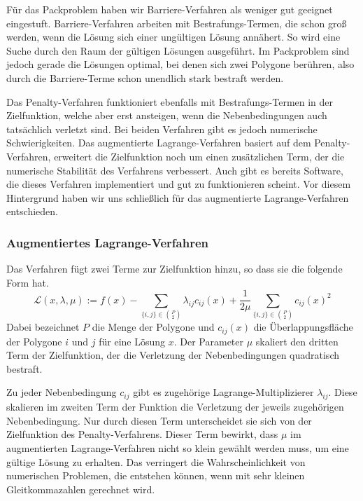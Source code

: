 \documentclass[runningheads,a4paper]{llncs}
\begin{document}
Für das Packproblem haben wir Barriere-Verfahren als weniger gut geeignet eingestuft. Barriere-Verfahren arbeiten mit Bestrafungs-Termen, die schon groß werden, wenn die Lösung sich einer ungültigen Lösung annähert. So wird eine Suche durch den Raum der gültigen Lösungen ausgeführt. Im Packproblem sind jedoch gerade die Lösungen optimal, bei denen sich zwei Polygone berühren, also durch die Barriere-Terme schon unendlich stark bestraft werden.

Das Penalty-Verfahren funktioniert ebenfalls mit Bestrafungs-Termen in der Zielfunktion, welche aber erst ansteigen, wenn die Nebenbedingungen auch tatsächlich verletzt sind. Bei beiden Verfahren gibt es jedoch numerische Schwierigkeiten. \cite{nocedal1999numerical} Das augmentierte Lagrange-Verfahren basiert auf dem Penalty-Verfahren, erweitert die Zielfunktion noch um einen zusätzlichen Term, der die numerische Stabilität des Verfahrens verbessert. Auch gibt es bereits Software, die dieses Verfahren implementiert und gut zu funktionieren scheint. \cite{Conn:2010:LFP:1965037} Vor diesem Hintergrund haben wir uns schließlich für das augmentierte Lagrange-Verfahren entschieden.

\subsubsection{Augmentiertes Lagrange-Verfahren}
Das Verfahren fügt zwei Terme zur Zielfunktion hinzu, so dass sie die folgende Form hat.
\begin{equation}
\label{eq:aug_lagrangian}
\mathcal{L}(x,\lambda,\mu) := f(x) - \sum_{\{i,j\}\in {P \choose 2}} \lambda_{ij} c_{ij}(x) + \frac{1}{2\mu}\sum_{\{i,j\}\in {P \choose 2}} c_{ij}(x)^2
\end{equation}
Dabei bezeichnet $P$ die Menge der Polygone und $c_{ij}(x)$ die Überlappungsfläche der Polygone $i$ und $j$ für eine Lösung $x$. Der Parameter $\mu$ skaliert den dritten Term der Zielfunktion, der die Verletzung der Nebenbedingungen quadratisch bestraft.

Zu jeder Nebenbedingung $c_{ij}$ gibt es zugehörige Lagrange-Multiplizierer $\lambda_{ij}$. Diese skalieren im zweiten Term der Funktion die Verletzung der jeweils zugehörigen Nebenbedingung. Nur durch diesen Term unterscheidet sie sich von der Zielfunktion des Penalty-Verfahrens. Dieser Term bewirkt, dass $\mu$ im augmentierten Lagrange-Verfahren nicht so klein gewählt werden muss, um eine gültige Lösung zu erhalten. Das verringert die Wahrscheinlichkeit von numerischen Problemen, die entstehen können, wenn mit sehr kleinen Gleitkommazahlen gerechnet wird.
\end{document}
